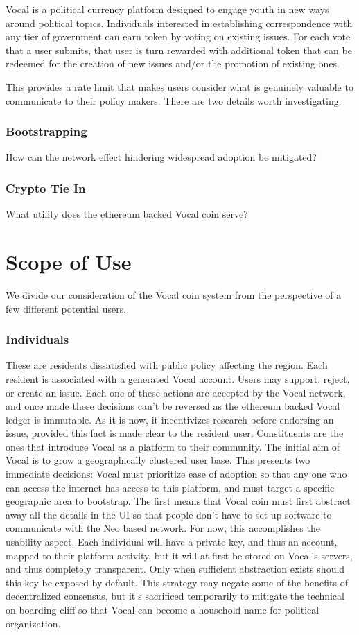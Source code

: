 \documentclass[conference]{IEEEtran}
\begin{document}
    Vocal is a political currency platform designed to engage youth in new ways around political topics. Individuals interested in establishing correspondence with any tier of government can earn token by voting on existing issues. For each vote that a user submits, that user is turn rewarded with additional token that can be redeemed for the creation of new issues and/or the promotion of existing ones.

    This provides a rate limit that makes users consider what is genuinely valuable to communicate to their policy makers. There are two details worth investigating:
  \subsubsection{Bootstrapping} How can the network effect hindering widespread adoption be mitigated?
  \subsubsection{Crypto Tie In} What utility does the ethereum backed Vocal coin serve?

    \section{Scope of Use}

    We divide our consideration of the Vocal coin system from the perspective of a few different potential users.

    \subsubsection{Individuals}
    These are residents dissatisfied with public policy affecting the region. Each resident is associated with a generated Vocal account. Users may support, reject, or create an issue. Each one of these actions are accepted by the Vocal network, and once made these decisions can't be reversed as the ethereum backed Vocal ledger is immutable. As it is now, it incentivizes research before endorsing an issue, provided this fact is made clear to the resident user.
    Constituents are the ones that introduce Vocal as a platform to their community. The initial aim of Vocal is to grow a geographically clustered user base. This presents two immediate decisions: Vocal must prioritize ease of adoption so that any one who can access the internet has access to this platform, and must target a specific geographic area to bootstrap.
    The first means that Vocal coin must first abstract away all the details in the UI so that people don't have to set up software to communicate with the Neo based network. For now, this accomplishes the usability aspect. Each individual will have a private key, and thus an account, mapped to their platform activity, but it will at first be stored on Vocal's servers, and thus completely transparent. Only when sufficient abstraction exists should this key be exposed by default. This strategy may negate some of the benefits of decentralized consensus, but it's sacrificed temporarily to mitigate the technical on boarding cliff so that Vocal can become a household name for political organization. 
\end{document}
